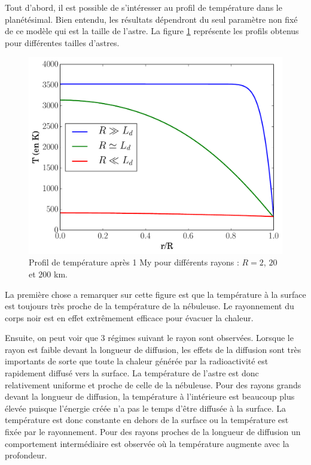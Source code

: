 \documentclass[10pt,a4paper]{article}
\numberwithin{equation}{section}
\begin{document}
Tout d'abord, il est possible de s'intéresser au profil de température dans le planétésimal. Bien entendu, les résultats dépendront du seul paramètre non fixé de ce modèle qui est la taille de l'astre. La figure \ref{diffusion2} représente les profils obtenus pour différentes tailles d'astres. 

\begin{figure}[h]
    \centering	    
	\includegraphics[scale=0.43]{figures/diffusion2.pdf}
    \caption{Profil de température après 1 My pour différents rayons : $R= 2$, $20$ et $200$ km. }
    	\label{diffusion2} 
\end{figure}

La première chose a remarquer sur cette figure est que la température à la surface est toujours très proche de la température de la nébuleuse. Le rayonnement du corps noir est en effet extrêmement efficace pour évacuer la chaleur. 
\medskip

Ensuite, on peut voir que 3 régimes suivant le rayon sont observées. Lorsque le rayon est faible devant la longueur de diffusion, les effets de la diffusion sont très importants de sorte que toute la chaleur générée par la radioactivité est rapidement diffusé vers la surface. La température de l'astre est donc relativement uniforme et proche de celle de la nébuleuse. Pour des rayons grands devant la longueur de diffusion, la température à l'intérieure est beaucoup plus élevée puisque l'énergie créée n'a pas le temps d'être diffusée à la surface. La température est donc constante en dehors de la surface ou la température est fixée par le rayonnement. Pour des rayons proches de la longueur de diffusion un comportement intermédiaire est observée où la température augmente avec la profondeur.
\end{document}
